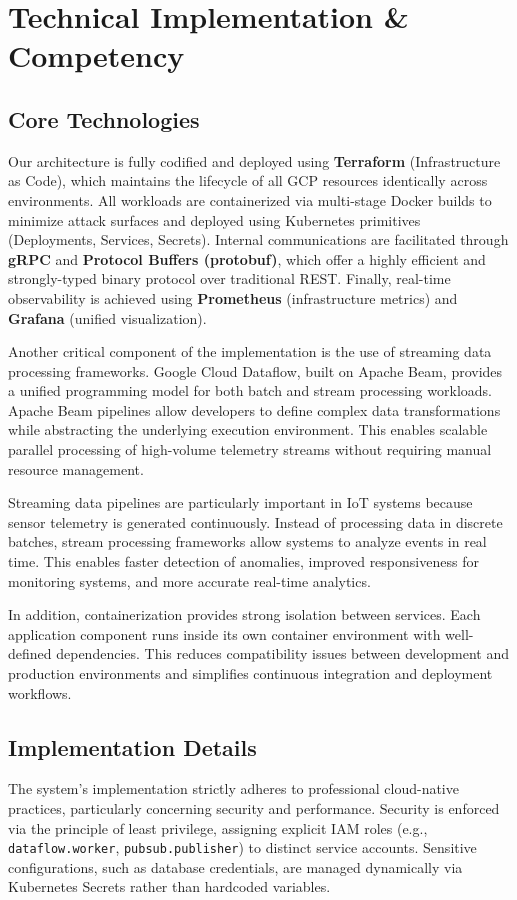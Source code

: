 \documentclass[conference]{IEEEtran}
\begin{document}
\section{Technical Implementation \& Competency}
\subsection{Core Technologies}
Our architecture is fully codified and deployed using \textbf{Terraform} (Infrastructure as Code), which maintains the lifecycle of all GCP resources identically across environments. All workloads are containerized via multi-stage Docker builds to minimize attack surfaces and deployed using Kubernetes primitives (Deployments, Services, Secrets). Internal communications are facilitated through \textbf{gRPC} and \textbf{Protocol Buffers (protobuf)}, which offer a highly efficient and strongly-typed binary protocol over traditional REST. Finally, real-time observability is achieved using \textbf{Prometheus} (infrastructure metrics) and \textbf{Grafana} (unified visualization).

Another critical component of the implementation is the use of streaming data processing frameworks. Google Cloud Dataflow, built on Apache Beam, provides a unified programming model for both batch and stream processing workloads. Apache Beam pipelines allow developers to define complex data transformations while abstracting the underlying execution environment. This enables scalable parallel processing of high-volume telemetry streams without requiring manual resource management.

Streaming data pipelines are particularly important in IoT systems because sensor telemetry is generated continuously. Instead of processing data in discrete batches, stream processing frameworks allow systems to analyze events in real time. This enables faster detection of anomalies, improved responsiveness for monitoring systems, and more accurate real-time analytics.

In addition, containerization provides strong isolation between services. Each application component runs inside its own container environment with well-defined dependencies. This reduces compatibility issues between development and production environments and simplifies continuous integration and deployment workflows.

\subsection{Implementation Details}
The system's implementation strictly adheres to professional cloud-native practices, particularly concerning security and performance. Security is enforced via the principle of least privilege, assigning explicit IAM roles (e.g., \texttt{dataflow.worker}, \texttt{pubsub.publisher}) to distinct service accounts. Sensitive configurations, such as database credentials, are managed dynamically via Kubernetes Secrets rather than hardcoded variables.
\end{document}
